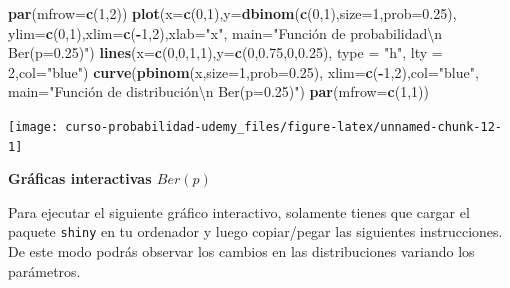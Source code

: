\documentclass[]{book}
\newenvironment{Shaded}{\begin{snugshade}}{\end{snugshade}}
\newcommand{\CharTok}[1]{\textcolor[rgb]{0.31,0.60,0.02}{#1}}
\newcommand{\DataTypeTok}[1]{\textcolor[rgb]{0.13,0.29,0.53}{#1}}
\newcommand{\DecValTok}[1]{\textcolor[rgb]{0.00,0.00,0.81}{#1}}
\newcommand{\FloatTok}[1]{\textcolor[rgb]{0.00,0.00,0.81}{#1}}
\newcommand{\KeywordTok}[1]{\textcolor[rgb]{0.13,0.29,0.53}{\textbf{#1}}}
\newcommand{\NormalTok}[1]{#1}
\newcommand{\OperatorTok}[1]{\textcolor[rgb]{0.81,0.36,0.00}{\textbf{#1}}}
\newcommand{\StringTok}[1]{\textcolor[rgb]{0.31,0.60,0.02}{#1}}
\begin{document}
\begin{Shaded}
\begin{Highlighting}[]
\KeywordTok{par}\NormalTok{(}\DataTypeTok{mfrow=}\KeywordTok{c}\NormalTok{(}\DecValTok{1}\NormalTok{,}\DecValTok{2}\NormalTok{))}
\KeywordTok{plot}\NormalTok{(}\DataTypeTok{x=}\KeywordTok{c}\NormalTok{(}\DecValTok{0}\NormalTok{,}\DecValTok{1}\NormalTok{),}\DataTypeTok{y=}\KeywordTok{dbinom}\NormalTok{(}\KeywordTok{c}\NormalTok{(}\DecValTok{0}\NormalTok{,}\DecValTok{1}\NormalTok{),}\DataTypeTok{size=}\DecValTok{1}\NormalTok{,}\DataTypeTok{prob=}\FloatTok{0.25}\NormalTok{),}
     \DataTypeTok{ylim=}\KeywordTok{c}\NormalTok{(}\DecValTok{0}\NormalTok{,}\DecValTok{1}\NormalTok{),}\DataTypeTok{xlim=}\KeywordTok{c}\NormalTok{(}\OperatorTok{-}\DecValTok{1}\NormalTok{,}\DecValTok{2}\NormalTok{),}\DataTypeTok{xlab=}\StringTok{"x"}\NormalTok{,}
     \DataTypeTok{main=}\StringTok{"Función de probabilidad}\CharTok{\textbackslash{}n}\StringTok{ Ber(p=0.25)"}\NormalTok{)}
\KeywordTok{lines}\NormalTok{(}\DataTypeTok{x=}\KeywordTok{c}\NormalTok{(}\DecValTok{0}\NormalTok{,}\DecValTok{0}\NormalTok{,}\DecValTok{1}\NormalTok{,}\DecValTok{1}\NormalTok{),}\DataTypeTok{y=}\KeywordTok{c}\NormalTok{(}\DecValTok{0}\NormalTok{,}\FloatTok{0.75}\NormalTok{,}\DecValTok{0}\NormalTok{,}\FloatTok{0.25}\NormalTok{), }\DataTypeTok{type =} \StringTok{"h"}\NormalTok{, }\DataTypeTok{lty =} \DecValTok{2}\NormalTok{,}\DataTypeTok{col=}\StringTok{"blue"}\NormalTok{)}
\KeywordTok{curve}\NormalTok{(}\KeywordTok{pbinom}\NormalTok{(x,}\DataTypeTok{size=}\DecValTok{1}\NormalTok{,}\DataTypeTok{prob=}\FloatTok{0.25}\NormalTok{),}
      \DataTypeTok{xlim=}\KeywordTok{c}\NormalTok{(}\OperatorTok{-}\DecValTok{1}\NormalTok{,}\DecValTok{2}\NormalTok{),}\DataTypeTok{col=}\StringTok{"blue"}\NormalTok{,}
      \DataTypeTok{main=}\StringTok{"Función de distribución\textbackslash{}n Ber(p=0.25)"}\NormalTok{)}
\KeywordTok{par}\NormalTok{(}\DataTypeTok{mfrow=}\KeywordTok{c}\NormalTok{(}\DecValTok{1}\NormalTok{,}\DecValTok{1}\NormalTok{))}
\end{Highlighting}
\end{Shaded}

\begin{center}\texttt{[image: curso-probabilidad-udemy\_files/figure-latex/unnamed-chunk-12-1]} \end{center}

\textbf{Gráficas interactivas \(Ber(p)\)}

Para ejecutar el siguiente gráfico interactivo, solamente tienes que cargar el paquete \texttt{shiny} en tu ordenador y luego copiar/pegar las siguientes instrucciones. De este modo podrás observar los cambios en las distribuciones variando los parámetros.
\end{document}
